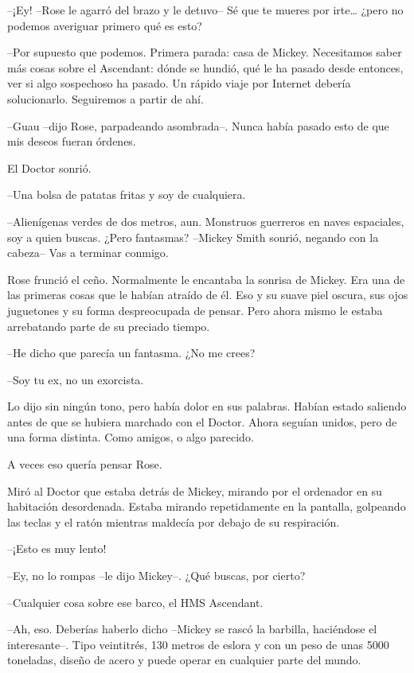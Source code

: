 {--¡Ey! --Rose le agarró del brazo y le detuvo-- Sé que te mueres por
 irte\ldots{} ¿pero no podemos averiguar primero qué es esto?}

{--Por supuesto que podemos. Primera parada: casa de Mickey. Necesitamos
 saber más cosas sobre el Ascendant: dónde se hundió, qué le ha pasado
 desde entonces, ver si algo sospechoso ha pasado. Un rápido viaje por
Internet debería solucionarlo. Seguiremos a partir de ahí.}

{--Guau --dijo Rose, parpadeando asombrada--. Nunca había pasado esto de
que mis deseos fueran órdenes.}

{El Doctor sonrió.}

{--Una bolsa de patatas fritas y soy de cualquiera.}

\mbox{}

{--Alienígenas verdes de dos metros, aun. Monstruos guerreros en naves
 espaciales, soy a quien buscas. ¿Pero fantasmas? --Mickey Smith sonrió,
negando con la cabeza-- Vas a terminar conmigo.}

{Rose frunció el ceño. Normalmente le encantaba la sonrisa de Mickey.
 Era una de las primeras cosas que le habían atraído de él. Eso y su
 suave piel oscura, sus ojos juguetones y su forma despreocupada de
 pensar. Pero ahora mismo le estaba arrebatando parte de su preciado
tiempo.}

{--He dicho que parecía un fantasma. ¿No me crees?}

{--Soy tu ex, no un exorcista.}

{Lo dijo sin ningún tono, pero había dolor en sus palabras. Habían
 estado saliendo antes de que se hubiera marchado con el Doctor. Ahora
 seguían unidos, pero de una forma distinta. Como amigos, o algo
parecido.}

{A veces eso quería pensar Rose.}

{Miró al Doctor que estaba detrás de Mickey, mirando por el ordenador en
 su habitación desordenada. Estaba mirando repetidamente en la pantalla,
 golpeando las teclas y el ratón mientras maldecía por debajo de su
respiración.}

{--¡Esto es muy lento!}

{--Ey, no lo rompas --le dijo Mickey--. ¿Qué buscas, por cierto?}

{--Cualquier cosa sobre ese barco, el HMS Ascendant.}

{--Ah, eso. Deberías haberlo dicho --Mickey se rascó la barbilla,
 haciéndose el interesante--. Tipo veintitrés, 130 metros de eslora y con
 un peso de unas 5000 toneladas, diseño de acero y puede operar en
cualquier parte del mundo.}

